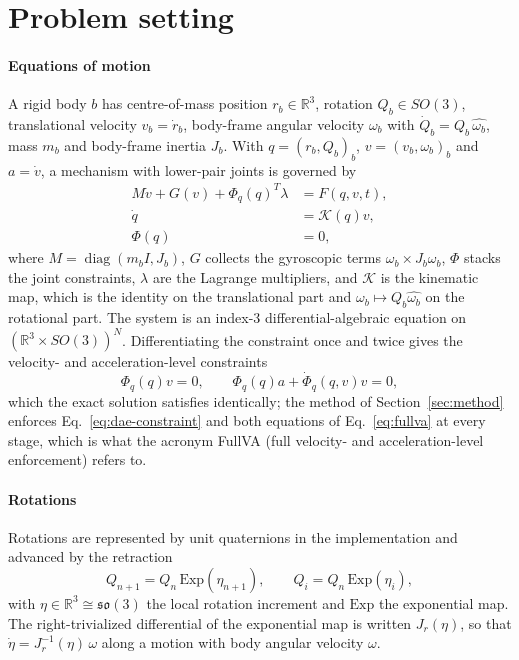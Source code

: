 \section{Problem setting}
\label{sec:setting}

\paragraph{Equations of motion}
A rigid body $b$ has centre-of-mass position $r_b\in\mathbb R^3$, rotation $Q_b\in SO(3)$,
translational velocity $v_b=\dot r_b$, body-frame angular velocity $\omega_b$ with
$\dot Q_b=Q_b\,\widehat{\omega_b}$, mass $m_b$ and body-frame inertia $J_b$. With
$q=(r_b,Q_b)_b$, $v=(v_b,\omega_b)_b$ and $a=\dot v$, a mechanism with lower-pair joints is
governed by
\begin{align}
  M\dot v + G(v) + \Phi_q(q)^T\lambda &= F(q,v,t), \label{eq:dae-dyn}\\
  \dot q &= \mathcal K(q)v, \label{eq:dae-kin}\\
  \Phi(q) &= 0, \label{eq:dae-constraint}
\end{align}
where $M=\operatorname{diag}(m_bI,J_b)$, $G$ collects the gyroscopic terms
$\omega_b\times J_b\omega_b$, $\Phi$ stacks the joint constraints, $\lambda$ are the Lagrange
multipliers, and $\mathcal K$ is the kinematic map, which is the identity on the translational part
and $\omega_b\mapsto Q_b\widehat{\omega_b}$ on the rotational part. The system is an index-3
differential-algebraic equation on $(\mathbb R^3\times SO(3))^{N}$. Differentiating the constraint
once and twice gives the velocity- and acceleration-level constraints
\begin{equation}
  \Phi_q(q)v=0,\qquad \Phi_q(q)a+\dot\Phi_q(q,v)v=0,
  \label{eq:fullva}
\end{equation}
which the exact solution satisfies identically; the method of Section~\ref{sec:method} enforces
Eq.~\eqref{eq:dae-constraint} and both equations of Eq.~\eqref{eq:fullva} at every stage, which
is what the acronym FullVA (full velocity- and acceleration-level enforcement) refers to.

\paragraph{Rotations}
Rotations are represented by unit quaternions in the implementation and advanced by the retraction
\begin{equation}
  Q_{n+1}=Q_n\,\mathrm{Exp}(\eta_{n+1}),\qquad Q_i=Q_n\,\mathrm{Exp}(\eta_i),
  \label{eq:retraction}
\end{equation}
with $\eta\in\mathbb R^3\cong\mathfrak{so}(3)$ the local rotation increment and $\mathrm{Exp}$
the exponential map. The right-trivialized differential of the exponential map is written
$J_r(\eta)$, so that $\dot\eta=J_r^{-1}(\eta)\,\omega$ along a motion with body angular velocity
$\omega$.

